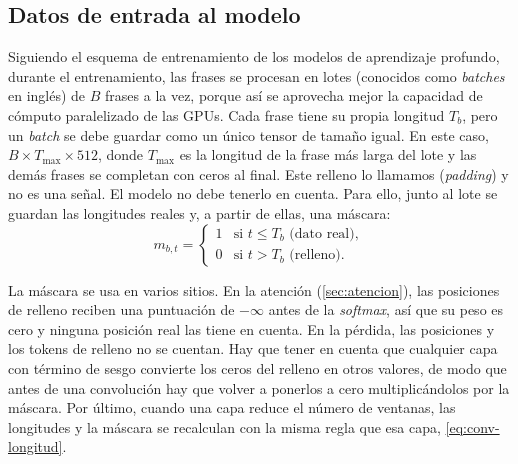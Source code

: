 \subsection{Datos de entrada al modelo}
\label{sec:datos-entrada}
\label{sec:mascaras}

Siguiendo el esquema de entrenamiento de los modelos de aprendizaje profundo, durante el entrenamiento, las frases se procesan en lotes (conocidos como \textit{batches} en inglés) de $B$ frases a la vez, porque así se aprovecha mejor la capacidad de cómputo paralelizado de las GPUs. Cada frase tiene su propia longitud $T_b$, pero un \textit{batch} se debe guardar como un único tensor de tamaño igual. En este caso, $B \times T_{\max} \times 512$, donde $T_{\max}$ es la longitud de la frase más larga del lote y las demás frases se completan con ceros al final. Este relleno lo llamamos (\textit{padding}) y no es una señal. El modelo no debe tenerlo en cuenta. Para ello, junto al lote se guardan las longitudes reales y, a partir de ellas, una máscara:
\begin{equation}
 m_{b,t} =
  \begin{cases}
    1 & \text{si } t \le T_b \text{ (dato real)},\\
    0 & \text{si } t > T_b \text{ (relleno)}.
  \end{cases}
  \label{eq:mascara}
\end{equation}

La máscara se usa en varios sitios. En la atención (\cref{sec:atencion}), las posiciones de relleno reciben una puntuación de $-\infty$ antes de la \textit{softmax}, así que su peso es cero y ninguna posición real las tiene en cuenta. En la pérdida, las posiciones y los tokens de relleno no se cuentan. Hay que tener en cuenta que cualquier capa con término de sesgo convierte los ceros del relleno en otros valores, de modo que antes de una convolución hay que volver a ponerlos a cero multiplicándolos por la máscara. Por último, cuando una capa reduce el número de ventanas, las longitudes y la máscara se recalculan con la misma regla que esa capa, \cref{eq:conv-longitud}.

